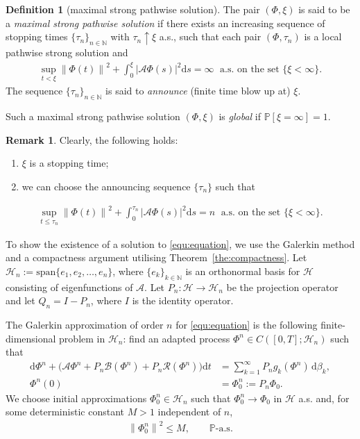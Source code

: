 \documentclass[11pt, reqno]{amsart}
\theoremstyle{definition}
\newtheorem{definition}[theorem]{Definition}
\newtheorem{remark}[theorem]{Remark}
\numberwithin{equation}{section}
\newcommand{\bb}{\mathbb}
\newcommand{\dt}{\mathrm{d}t}
\newcommand{\ds}{\mathrm{d}s}
\newcommand{\norm}[1]{\left\|{#1}\right\|}
\newcommand{\abs}[1]{\left|{#1}\right|}
\begin{document}
\begin{definition}[maximal strong pathwise solution]\label{def:global strong sol}
The pair $(\Phi,\xi)$ is said to be a \emph{maximal strong pathwise solution} if there exists an increasing sequence of stopping times $\{\tau_n\}_{n\in \bb{N}}$ with $\tau_n \uparrow \xi$ a.s., such that each pair $(\Phi,\tau_n)$ is a local pathwise strong solution and
\begin{align*}
	\sup_{t<\xi} \norm{\Phi(t)}^2 + \int_0^\xi \abs{\mathcal{A}\Phi(s)}^2 \ds = \infty \;\text{ a.s. on the set } \{\xi<\infty\}.
\end{align*}
The sequence $\{\tau_n\}_{n\in \bb{N}}$ is said to \emph{announce} (finite time blow up at) $\xi$. 

Such a maximal strong pathwise solution $(\Phi,\xi)$ is \emph{global} if $\bb{P}\left[\xi=\infty \right]=1$.
\end{definition}

\begin{remark}\label{rem1}
Clearly, the following holds:
\begin{enumerate}
\item $\xi$ is a stopping time;
\item we can choose the announcing sequence $\{\tau_n\}$ such that
\end{enumerate}
\begin{align*}
	\sup_{t\leq \tau_n} \norm{\Phi(t)}^2 + \int_0^{\tau_n} \abs{\mathcal{A}\Phi(s)}^2 \ds = n \;\text{ a.s. on the set } \{\xi<\infty\}.
\end{align*}
\end{remark}
To show the existence of a solution to \eqref{equ:equation}, we use the Galerkin method and a compactness argument utilising Theorem~\ref{the:compactness}. Let $\mathcal{H}_n:= \text{span}\{e_1,e_2,\ldots,e_n\}$, where $\{e_k\}_{k\in \bb{N}}$ is an orthonormal basis for $\mathcal{H}$ consisting of eigenfunctions of $\mathcal{A}$. Let $P_n:\mathcal{H}\to \mathcal{H}_n$ be the projection operator and let $Q_n=I-P_n$, where $I$ is the identity operator.

The Galerkin approximation of order $n$ for \eqref{equ:equation} is the following finite-dimensional problem in $\mathcal{H}_n$: find an adapted process $\Phi^n \in C([0,T];\mathcal{H}_n)$ such that
\begin{equation}
\begin{aligned}\label{equ:galerkin}
	\mathrm{d}\Phi^n + \big(\mathcal{A} \Phi^n + P_n \mathcal{B}(\Phi^n) + P_n \mathcal{R}(\Phi^n) \big) \dt
	&=
	\sum_{k=1}^\infty P_n g_k(\Phi^n)\, \mathrm{d}\beta_k,
	\\
	\Phi^n(0) &= \Phi_0^n:= P_n \Phi_0.
\end{aligned}
\end{equation}
We choose initial approximations $\Phi_0^n\in\mathcal H_n$ such that $\Phi_0^n\to \Phi_0$ in $\mathcal{H}$ a.s. and, for some deterministic constant $M>1$ independent of $n$,
\begin{align}\label{equ:M}
	\norm{\Phi_0^n}^2\leq M,
	\qquad \mathbb P\text{-a.s.}
\end{align}
\end{document}
